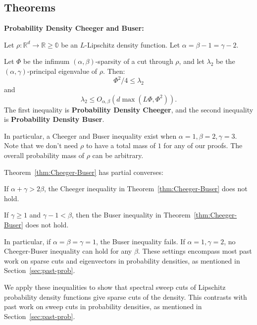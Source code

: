 \subsection{Theorems}


\begin{theorem}\label{thm:Cheeger-Buser}
  \textbf{Probability Density Cheeger and Buser:}

  Let $\rho:\mathbb{R}^d \rightarrow \mathbb{R \geq 0}$ be an $L$-Lipschitz
  density function. Let $\alpha = \beta - 1 = \gamma - 2$.

  Let $\Phi$ be the infimum $(\alpha,\beta)$-sparsity of a cut through
  $\rho$, and let $\lambda_2$ be the $(\alpha,\gamma)$-principal eigenvalue of
  $\rho$. Then:
  \[ \Phi^2/4 \leq \lambda_2 \]
  and 
  \[\lambda _2 \leq O_{\alpha, \beta}(d \max(L \Phi, \Phi^2)).\]
  The first inequality is \textbf{Probability Density Cheeger}, and
  the second inequality is \textbf{Probability Density Buser}.
\end{theorem}
In particular, a Cheeger and Buser inequality exist when $\alpha = 1,
\beta = 2, \gamma=3$. Note that we don't need $\rho$ to have a total mass of $1$ for any
of our proofs. The overall probability mass of $\rho$ can be arbitrary.


Theorem~\ref{thm:Cheeger-Buser} has partial converses:

\begin{lemma} \label{lem:cheeger-converse} If $\alpha + \gamma >
  2\beta$, the Cheeger inequality in Theorem~\ref{thm:Cheeger-Buser}
  does not hold.
\end{lemma}

\begin{lemma} \label{lem:buser-converse} If $\gamma \geq 1$ and $\gamma -1 < \beta$, then the
  Buser inequality in Theorem~\ref{thm:Cheeger-Buser} does not
  hold.
\end{lemma}

In particular, if $\alpha = \beta = \gamma = 1$, the Buser inequality
fails.  If $\alpha = 1, \gamma =2$, no
Cheeger-Buser inequality can hold for any $\beta$. These settings
encompass most past work on sparse cuts and eigenvectors in probability
densities, as mentioned in Section~\ref{sec:past-prob}.

We apply these inequalities to show that spectral sweep cuts of
Lipschitz probability density functions give sparse cuts of the density.
This contrasts with past work on sweep cuts in probability
densities, as mentioned in Section~\ref{sec:past-prob}.

